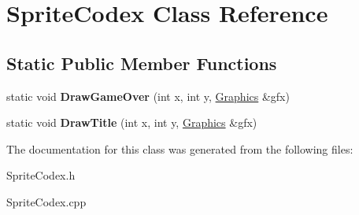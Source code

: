 \hypertarget{class_sprite_codex}{}\section{Sprite\+Codex Class Reference}
\label{class_sprite_codex}
\subsection*{Static Public Member Functions}
\begin{DoxyCompactItemize}
\item 
\mbox{\label{class_sprite_codex_ab54c26dad73c7af8ed9710882b00fcff}} 
static void {\bfseries Draw\+Game\+Over} (int x, int y, \hyperlink{class_graphics}{Graphics} \&gfx)
\item 
\mbox{\label{class_sprite_codex_a0ec729dc12ae0f15800415f6bb54e29b}} 
static void {\bfseries Draw\+Title} (int x, int y, \hyperlink{class_graphics}{Graphics} \&gfx)
\end{DoxyCompactItemize}


The documentation for this class was generated from the following files\+:\begin{DoxyCompactItemize}
\item 
Sprite\+Codex.\+h\item 
Sprite\+Codex.\+cpp\end{DoxyCompactItemize}
